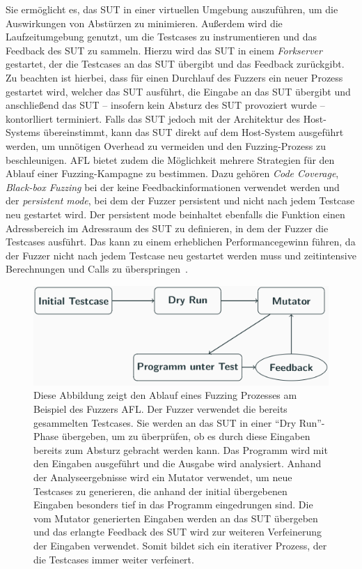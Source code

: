 Sie ermöglicht es, das SUT in einer virtuellen Umgebung auszuführen, um die Auswirkungen von Abstürzen zu minimieren.
Außerdem wird die Laufzeitumgebung genutzt, um die Testcases zu instrumentieren und das Feedback des SUT zu sammeln.
Hierzu wird das SUT in einem \textit{Forkserver}~\cite{afl_whitepaper} gestartet, der die Testcases an das SUT übergibt und das Feedback
zurückgibt.
Zu beachten ist hierbei, dass für einen Durchlauf des Fuzzers ein neuer Prozess gestartet wird, welcher das SUT ausführt,
die Eingabe an das SUT übergibt und anschließend das SUT -- insofern kein Absturz des SUT provoziert wurde -- kontorlliert
terminiert.
Falls das SUT jedoch mit der Architektur des Host-Systems übereinstimmt, kann das SUT direkt auf dem Host-System ausgeführt
werden, um unnötigen Overhead zu vermeiden und den Fuzzing-Prozess zu beschleunigen.\newline
AFL bietet zudem die Möglichkeit mehrere Strategien für den Ablauf einer Fuzzing-Kampagne zu bestimmen.
Dazu gehören \textit{Code Coverage}, \textit{Black-box Fuzzing} bei der keine Feedbackinformationen verwendet werden und
der \textit{persistent mode}, bei dem der Fuzzer persistent und nicht nach jedem Testcase neu gestartet wird.
Der persistent mode beinhaltet ebenfalls die Funktion einen Adressbereich im Adressraum des SUT zu definieren, in dem der
Fuzzer die Testcases ausführt.
Das kann zu einem erheblichen Performancegewinn führen, da der Fuzzer nicht nach jedem Testcase neu gestartet werden muss
und zeitintensive Berechnungen und Calls zu überspringen~\cite{afl_whitepaper}.
\begin{figure}
    \centering
    \includegraphics[width=\columnwidth]{res/Struktur_eines_fuzzing_prozesses}
    \caption[Struktur eines Fuzzing Prozesses]{
        Diese Abbildung zeigt den Ablauf eines Fuzzing Prozesses am Beispiel des Fuzzers AFL.
        Der Fuzzer verwendet die bereits gesammelten Testcases.
        Sie werden an das SUT in einer \enquote{Dry Run}-Phase übergeben, um zu überprüfen, ob es durch diese Eingaben
        bereits zum Absturz gebracht werden kann.
        Das Programm wird mit den Eingaben ausgeführt und die Ausgabe wird analysiert.
        Anhand der Analyseergebnisse wird ein Mutator verwendet, um neue Testcases zu generieren, die anhand der initial
        übergebenen Eingaben besonders tief in das Programm eingedrungen sind.
        Die vom Mutator generierten Eingaben werden an das SUT übergeben und das erlangte Feedback des SUT wird zur weiteren
        Verfeinerung der Eingaben verwendet.
        Somit bildet sich ein iterativer Prozess, der die Testcases immer weiter verfeinert.
    }\label{fig:struktur_fuzzing}
\end{figure}
